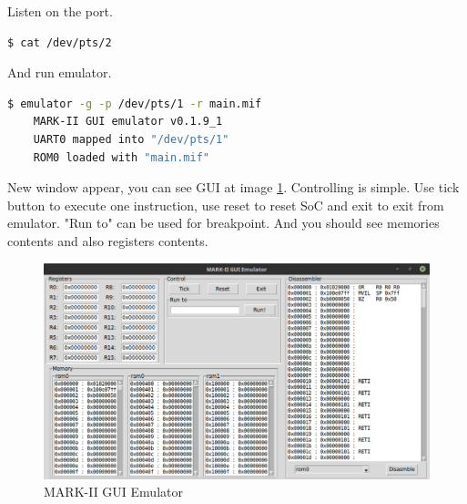 Listen on the port.

\begin{lstlisting}[language=bash, frame=single]
    $ cat /dev/pts/2
\end{lstlisting}

And run emulator.

\begin{lstlisting}[language=bash, frame=single]
    $ emulator -g -p /dev/pts/1 -r main.mif
    MARK-II GUI emulator v0.1.9_1
    UART0 mapped into "/dev/pts/1"
    ROM0 loaded with "main.mif"
\end{lstlisting}

New window appear, you can see GUI at image \ref{fig:gui_emulator}. Controlling
is simple. Use tick button to execute one instruction, use reset to reset SoC
and exit to exit from emulator. "Run to" can be used for breakpoint. And you
should see memories contents and also registers contents.

\begin{figure}[h]
    \centering
    \includegraphics[width=\textwidth]{img/emulator.png}
    \caption{MARK-II GUI Emulator}
    \label{fig:gui_emulator}
\end{figure}
